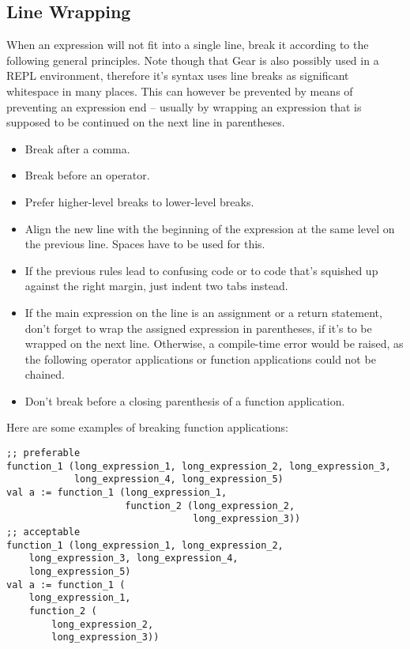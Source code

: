 \subsection{Line Wrapping}

When an expression will not fit into a single line, break it according to the following general principles. Note though that Gear is also possibly used in a REPL environment, therefore it's syntax uses line breaks as significant whitespace in many places. This can however be prevented by means of preventing an expression end -- usually by wrapping an expression that is supposed to be continued on the next line in parentheses. 

\begin{itemize}
\item Break after a comma. 
\item Break before an operator. 
\item Prefer higher-level breaks to lower-level breaks. 
\item Align the new line with the beginning of the expression at the same level on the previous line. Spaces have to be used for this. 
\item If the previous rules lead to confusing code or to code that's squished up against the right margin, just indent two tabs instead. 
\item If the main expression on the line is an assignment or a return statement, don't forget to wrap the assigned expression in parentheses, if it's to be wrapped on the next line. Otherwise, a compile-time error would be raised, as the following operator applications or function applications could not be chained. 
\item Don't break before a closing parenthesis of a function application.  
\end{itemize}

\example Here are some examples of breaking function applications: 

\begin{lstlisting}
;; preferable
function_1 (long_expression_1, long_expression_2, long_expression_3,
            long_expression_4, long_expression_5)
val a := function_1 (long_expression_1,
                     function_2 (long_expression_2,
                                 long_expression_3))
;; acceptable
function_1 (long_expression_1, long_expression_2, 
    long_expression_3, long_expression_4, 
    long_expression_5)
val a := function_1 (
    long_expression_1,
    function_2 (
        long_expression_2,
        long_expression_3))
\end{lstlisting}

